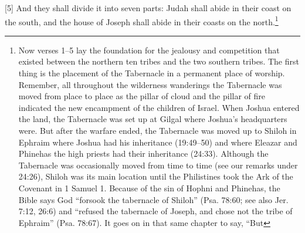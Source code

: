[5] \textcolor[rgb]{0.00,0.00,1.00}{And they shall divide it into seven parts: Judah shall abide in their coast on the south, and the house of Joseph shall abide in their coasts on the north.}\footnote{Now verses 1–5 lay the foundation for the
jealousy and competition that existed between
the northern ten tribes and the two southern
tribes. The first thing is the placement of the
Tabernacle in a permanent place of worship.
Remember, all throughout the wilderness
wanderings the Tabernacle was moved from
place to place as the pillar of cloud and the
pillar of fire indicated the new encampment of
the children of Israel. When Joshua entered the
land, the Tabernacle was set up at Gilgal where
Joshua’s headquarters were. But after the
warfare ended, the Tabernacle was moved up to
Shiloh in Ephraim where Joshua had his
inheritance (19:49–50) and where Eleazar and
Phinehas the high priests had their inheritance
(24:33). Although the Tabernacle was
occasionally moved from time to time (see our
remarks under 24:26), Shiloh was its main
location until the Philistines took the Ark of the
Covenant in 1 Samuel 1. Because of the sin of
Hophni and Phinehas, the Bible says God
“forsook the tabernacle of Shiloh” (Psa.
78:60; see also Jer. 7:12, 26:6) and “refused
the tabernacle of Joseph, and chose not the
tribe of Ephraim” (Psa. 78:67). It goes on in that same chapter to say, “But
}
